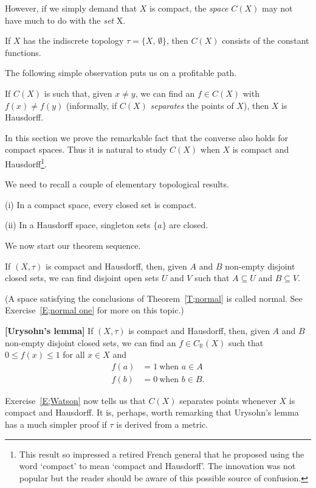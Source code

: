 However, if we simply demand that $X$ is compact, the 
\emph{space} $C(X)$
may not have much to do with the \emph{set} X.
\begin{exercise} If $X$ has the indiscrete topology
$\tau=\{X,\,\emptyset\}$, then $C(X)$ consists of the constant functions.
\end{exercise}
The following simple observation puts us on a profitable path.
\begin{exercise} If $C(X)$ is such that, given $x\neq y$,
we can find an $f\in C(X)$ with $f(x)\neq f(y)$
(informally, if $C(X)$ \emph{separates} the points of $X$),
then $X$ is Hausdorff.
\end{exercise}
In this section we prove the remarkable fact that the converse
also holds for compact spaces. 
Thus it is natural to study $C(X)$ when $X$
is compact and Hausdorff\footnote{This result so impressed
a retired French general that he proposed using the
word `compact' to mean `compact and Hausdorff'. The innovation
was not popular but the reader should be aware of this possible
source of confusion.}.

We need to recall a couple of elementary topological results.
\begin{exercise}\label{E;Watson} 
(i) In a compact space, every closed set is compact.

(ii) In a Hausdorff space, singleton sets $\{a\}$ are closed.
\end{exercise}
We now start our theorem sequence.
\begin{theorem}\label{T;normal} If $(X,\tau)$ is compact and Hausdorff,
then, given $A$ and $B$ non-empty disjoint closed sets, 
we can find disjoint open sets $U$ and $V$ such that
$A\subseteq U$ and $B\subseteq V$.
\end{theorem}
(A space satisfying the conclusions of Theorem~\ref{T;normal}
is called normal. See Exercise~\ref{E;normal one} for more on this topic.)
\begin{theorem} {\bf[Urysohn's lemma]} If $(X,\tau)$ is
compact and Hausdorff,
then, given $A$ and $B$ non-empty disjoint closed sets, 
we can find an $f\in C_{\mathbb R}(X)$ such that
$0\leq f(x)\leq 1$ for all $x\in X$ and 
\begin{align*}
f(a)&=1\ \text{when $a\in A$}\\
f(b)&=0\ \text{when $b\in B$}.
\end{align*}
\end{theorem}
Exercise~\ref{E;Watson} now tells us that $C(X)$ separates
points whenever $X$ is compact and Hausdorff.
It is, perhaps, worth remarking that Urysohn's lemma
has a much simpler proof if $\tau$ is derived from a metric.


